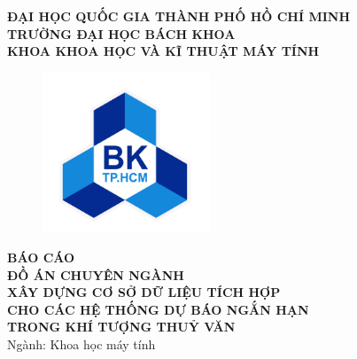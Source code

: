 \documentclass[12pt, a4paper]{report}
\theoremstyle{definition}
\begin{document}
\begin{titlepage}

    \begin{center}
        \large \textbf{ĐẠI HỌC QUỐC GIA THÀNH PHỐ HỒ CHÍ MINH} \\
        \large \textbf{TRƯỜNG ĐẠI HỌC BÁCH KHOA} \\
        \large \textbf{KHOA KHOA HỌC VÀ KĨ THUẬT MÁY TÍNH}
    \end{center}

    \begin{figure}[h!]
        \begin{center}
            \includegraphics[width=5cm]{Images/hcmut.png}
        \end{center}
    \end{figure}

    \begin{center}
        {\textbf{\Large BÁO CÁO}}\\
        {\textbf{{\Large ĐỒ ÁN CHUYÊN NGÀNH}}}\\
        \vspace{1cm}
        \textbf{\LARGE XÂY DỰNG CƠ SỞ DỮ LIỆU TÍCH HỢP}\\
        \textbf{\LARGE CHO CÁC HỆ THỐNG DỰ BÁO NGẮN HẠN}\\
        \textbf{\LARGE TRONG KHÍ TƯỢNG THUỶ VĂN}\\
        \vspace{0.3cm}
        {\Large Ngành: Khoa học máy tính}\\
    \end{center}


\end{titlepage}
\end{document}
